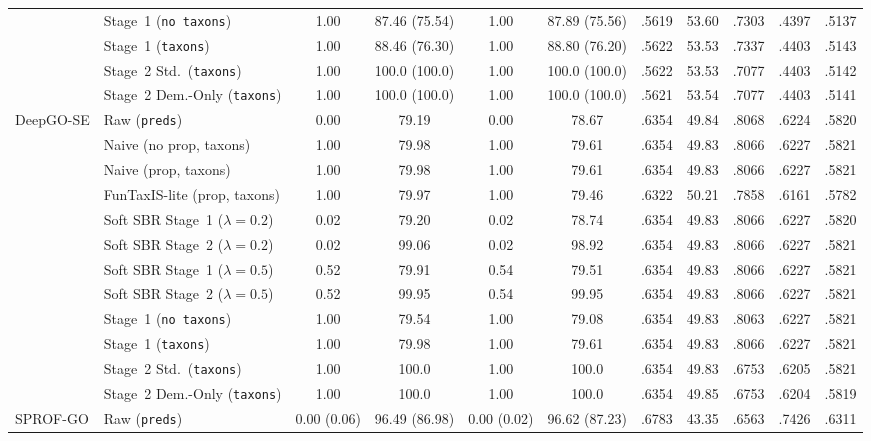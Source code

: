\begin{table}[!h]
\begin{tabular}{ll cc cc ccccc}
 & Stage~1 (\texttt{no taxons})     & 1.00 & 87.46 (75.54) & 1.00 & 87.89 (75.56) & .5619 & 53.60 & .7303 & .4397 & .5137 \\
 & Stage~1 (\texttt{taxons})        & 1.00 & 88.46 (76.30) & 1.00 & 88.80 (76.20) & .5622 & 53.53 & .7337 & .4403 & .5143 \\
 & Stage~2 Std.\ (\texttt{taxons})  & 1.00 & 100.0 (100.0) & 1.00 & 100.0 (100.0) & .5622 & 53.53 & .7077 & .4403 & .5142 \\
 & Stage~2 Dem.-Only (\texttt{taxons}) & 1.00 & 100.0 (100.0) & 1.00 & 100.0 (100.0) & .5621 & 53.54 & .7077 & .4403 & .5141 \\
\midrule
\multirow{12}{*}{DeepGO-SE}
 & Raw (\texttt{preds})             & 0.00 & 79.19 & 0.00 & 78.67 & .6354 & 49.84 & .8068 & .6224 & .5820 \\
 & Naive (no prop, taxons)          & 1.00 & 79.98 & 1.00 & 79.61 & .6354 & 49.83 & .8066 & .6227 & .5821 \\
 & Naive (prop, taxons)             & 1.00 & 79.98 & 1.00 & 79.61 & .6354 & 49.83 & .8066 & .6227 & .5821 \\
 & FunTaxIS-lite (prop, taxons)     & 1.00 & 79.97 & 1.00 & 79.46 & .6322 & 50.21 & .7858 & .6161 & .5782 \\
 & Soft SBR Stage~1 ($\lambda=0.2$) & 0.02 & 79.20 & 0.02 & 78.74 & .6354 & 49.83 & .8066 & .6227 & .5820 \\
 & Soft SBR Stage~2 ($\lambda=0.2$) & 0.02 & 99.06 & 0.02 & 98.92 & .6354 & 49.83 & .8066 & .6227 & .5821 \\
 & Soft SBR Stage~1 ($\lambda=0.5$) & 0.52 & 79.91 & 0.54 & 79.51 & .6354 & 49.83 & .8066 & .6227 & .5821 \\
 & Soft SBR Stage~2 ($\lambda=0.5$) & 0.52 & 99.95 & 0.54 & 99.95 & .6354 & 49.83 & .8066 & .6227 & .5821 \\
 & Stage~1 (\texttt{no taxons})     & 1.00 & 79.54 & 1.00 & 79.08 & .6354 & 49.83 & .8063 & .6227 & .5821 \\
 & Stage~1 (\texttt{taxons})        & 1.00 & 79.98 & 1.00 & 79.61 & .6354 & 49.83 & .8066 & .6227 & .5821 \\
 & Stage~2 Std.\ (\texttt{taxons})  & 1.00 & 100.0 & 1.00 & 100.0 & .6354 & 49.83 & .6753 & .6205 & .5821 \\
 & Stage~2 Dem.-Only (\texttt{taxons}) & 1.00 & 100.0 & 1.00 & 100.0 & .6354 & 49.85 & .6753 & .6204 & .5819 \\
\midrule
\multirow{12}{*}{SPROF-GO}
 & Raw (\texttt{preds})             & 0.00 (0.06) & 96.49 (86.98) & 0.00 (0.02) & 96.62 (87.23) & .6783 & 43.35 & .6563 & .7426 & .6311 \\

\end{tabular}
\end{table}
